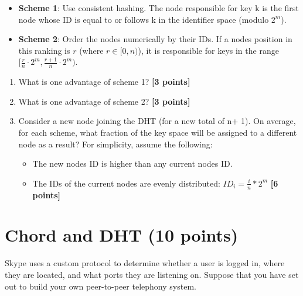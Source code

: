\documentclass{article}
\begin{document}
\begin{itemize}
\item{\textbf{Scheme 1}: Use consistent hashing. The node responsible for key k is the first node whose ID is equal to or follows k in the identifier space (modulo $2^m$).}
\item{\textbf{Scheme 2}: Order the nodes numerically by their IDs. If a nodes
position in this ranking is $r$ (where $r \in [0, n)$), it is responsible for
keys in the range $[\frac{r}{n}\cdot2^m, \frac{r+1}{n}\cdot2^m)$.}
\end{itemize}

\begin{enumerate}
\item{What is one advantage of scheme 1? \textbf{[3 points]}}

\item{What is one advantage of scheme 2? \textbf{[3 points]}}

\item{Consider a new node joining the DHT (for a new total of n+ 1). On
average, for each scheme, what fraction of the key space will be assigned to a
different node as a result? For simplicity, assume the following:
\begin{itemize}
\item{The new nodes ID is higher than any current nodes ID.}
\item{The IDs of the current nodes are evenly distributed: $ID_i = \frac{i}{n}
* 2^m$} \textbf{[6 points]}
\end{itemize}}

\end{enumerate}


\section{Chord and DHT (10 points)}
Skype uses a custom protocol to determine whether a user is logged
in, where they are located, and what ports they are listening on.
Suppose that you have set out to build your own peer-to-peer telephony
system.
\end{document}
